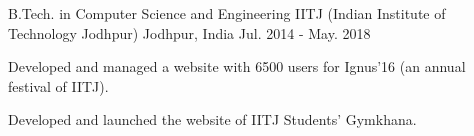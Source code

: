 

\begin{cventries}

  \cventry
    {B.Tech. in Computer Science and Engineering} %
    {IITJ (Indian Institute of Technology Jodhpur)} %
    {Jodhpur, India} %
    {Jul. 2014 - May. 2018} %
    {
      \begin{cvitems} %
        \item {Developed and managed a website with 6500 users for Ignus'16 (an annual festival of IITJ).}
        \item {Developed and launched the website of IITJ Students' Gymkhana.}
      \end{cvitems}
    }

\end{cventries}
